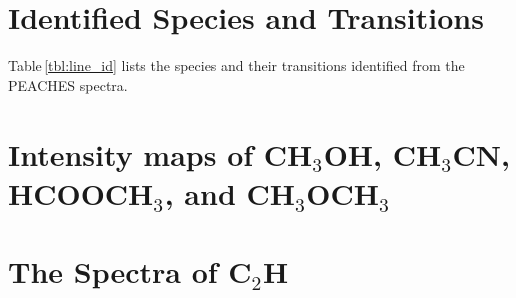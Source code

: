 \documentclass[twocolumn]{aastex62}
\newcommand{\methylformate}{\mbox{HCOOCH$_{3}$}}
\newcommand{\methanol}{\mbox{CH$_{3}$OH}}
\newcommand{\dimethylether}{\mbox{CH$_{3}$OCH$_{3}$}}
\newcommand{\methylcyanide}{\mbox{CH$_{3}$CN}}
\newcommand{\cch}{\mbox{C$_2$H}}
\begin{document}
\newpage
\section{Identified Species and Transitions}
Table\,\ref{tbl:line_id} lists the species and their transitions identified from the PEACHES spectra.
\newpage
% 

\section{Intensity maps of \methanol, \methylcyanide, \methylformate, and \dimethylether}
\label{sec:coms_maps}


\section{The Spectra of \cch}

\end{document}
